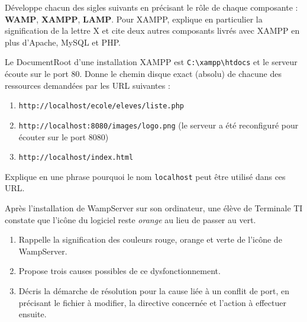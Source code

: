 \documentclass[11pt]{article}
\newcounter{popsec}
\newcounter{popsub}
\newcommand{\courssub}[1]{%
  \stepcounter{popsub}%
  \par\vspace{9pt}\noindent{\popxbold\fontsize{11.5}{13}\selectfont\color{popink}{\color{poporange}\thepopsec.\thepopsub}\hspace{6pt}#1}\par\nopagebreak\vspace{4pt}
}
\begin{document}
\begin{exercice}
Développe chacun des sigles suivants en précisant le rôle de chaque composante : \textbf{WAMP}, \textbf{XAMPP}, \textbf{LAMP}. Pour XAMPP, explique en particulier la signification de la lettre \og X \fg{} et cite deux autres composants livrés avec XAMPP en plus d'Apache, MySQL et PHP.
\end{exercice}

\begin{exercice}
Le DocumentRoot d'une installation XAMPP est \texttt{C:\textbackslash xampp\textbackslash htdocs} et le serveur écoute sur le port 80. Donne le chemin disque exact (absolu) de chacune des ressources demandées par les URL suivantes :
\begin{enumerate}
\item \texttt{http://localhost/ecole/eleves/liste.php}
\item \texttt{http://localhost:8080/images/logo.png} (le serveur a été reconfiguré pour écouter sur le port 8080)
\item \texttt{http://localhost/index.html}
\end{enumerate}
Explique en une phrase pourquoi le nom \texttt{localhost} peut être utilisé dans ces URL.
\end{exercice}

\courssub{Je m'entraîne}

\begin{exercice}
Après l'installation de WampServer sur son ordinateur, une élève de Terminale TI constate que l'icône du logiciel reste \emph{orange} au lieu de passer au vert.
\begin{enumerate}
\item Rappelle la signification des couleurs rouge, orange et verte de l'icône de WampServer.
\item Propose trois causes possibles de ce dysfonctionnement.
\item Décris la démarche de résolution pour la cause liée à un conflit de port, en précisant le fichier à modifier, la directive concernée et l'action à effectuer ensuite.
\end{enumerate}
\end{exercice}
\end{document}
